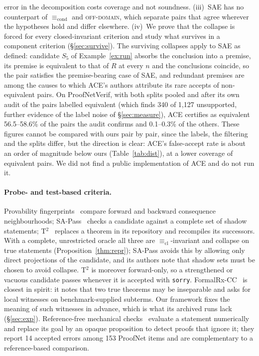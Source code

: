 \documentclass[10pt]{article}
\theoremstyle{definition}
\newcommand{\Ecl}{\mathrel{\equiv_{\mathrm{cl}}}}
\newcommand{\Econd}{\mathrel{\equiv_{\mathrm{cond}}}}
\newcommand{\V}[1]{\textsc{#1}}
\begin{document}
error in the decomposition costs coverage and not soundness.
(iii)~SAE has no counterpart of $\Econd$ and \V{off-domain}, which separate pairs that agree
wherever the hypotheses hold and differ elsewhere.
(iv)~We prove that the collapse is forced for every closed-invariant criterion and study what
survives in a component criterion (\S\ref{sec:survive}). The surviving collapses apply to SAE as
defined: candidate $S_5$ of Example~\ref{ex:run} absorbs the conclusion into a premise, its
premise is equivalent to that of $R$ at every $n$ and the conclusions coincide, so the pair
satisfies the premise-bearing case of SAE, and redundant premises are among the causes to which
ACE's authors attribute its rare accepts of non-equivalent pairs.
On ProofNetVerif, with both splits pooled and after its own audit of the pairs labelled
equivalent (which finds 340 of 1,127 unsupported, further evidence of the label noise of
\S\ref{sec:measure}), ACE certifies as equivalent 56.5--58.6\% of the pairs the audit confirms
and 0.1--0.3\% of the others. These figures cannot be compared with ours pair by pair, since the
labels, the filtering and the splits differ, but the direction is clear: ACE's false-accept rate
is about an order of magnitude below ours (Table~\ref{tab:dist}), at a lower coverage of
equivalent pairs. We did not find a public implementation of ACE and do not run it.

\paragraph{Probe- and test-based criteria.} Provability fingerprints~\cite{bpf} compare forward
and backward consequence neighbourhoods; SA-Pass~\cite{shadowbench} checks a candidate against
a complete set of shadow statements; T$^2$~\cite{t2} replaces a theorem in its repository and
recompiles its successors. With a complete, unrestricted oracle all three are $\Ecl$-invariant
and collapse on true statements (Proposition~\ref{thm:repr}); SA-Pass avoids this by allowing only
direct projections of the candidate, and its authors note that shadow sets must be chosen to avoid
collapse. T$^2$ is moreover forward-only, so a strengthened or
vacuous candidate passes whenever it is accepted with \texttt{sorry}. FormalRx-CC~\cite{formalrxcc}
is closest in spirit: it notes that two true theorems may be inseparable and asks for local
witnesses on benchmark-supplied subterms. Our framework fixes the meaning of such witnesses in
advance, which is what its archived runs lack (\S\ref{sec:exp}). Reference-free mechanical
checks~\cite{meidouglas} evaluate a statement numerically and replace its goal by an opaque
proposition to detect proofs that ignore it; they report 14 accepted errors among 153 ProofNet
items and are complementary to a reference-based comparison.
\end{document}
